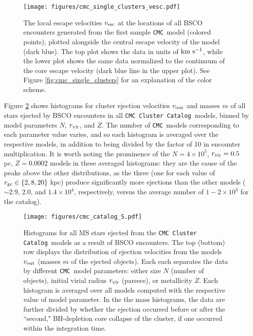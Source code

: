 \documentclass[twocolumn]{aastex631}
\newcommand{\CMC}{\texttt{CMC}}
\newcommand{\CMCcat}{\texttt{CMC Cluster Catalog}}
\begin{document}
\begin{figure}
    \centering
    \texttt{[image: figures/cmc\_single\_clusters\_vesc.pdf]}
    \caption{
        The local escape velocities $v_{\rm esc}$ at the locations of all BSCO encounters generated from the first sample \CMC\ model (colored points), plotted alongside the central escape velocity of the model (dark blue).
        The top plot shows the data in units of ${\rm km~s^{-1}}$, while the lower plot shows the same data normalized to the continuum of the core escape velocity (dark blue line in the upper plot).
        See Figure \ref{fig:cmc_single_clusters} for an explanation of the color scheme.
    }
    \label{fig:cmc_single_clusters_vesc}
\end{figure}

Figure \ref{fig:cmc_catalog} shows histograms for cluster ejection velocities $v_{\rm out}$ and masses $m$ of all stars ejected by BSCO encounters in all \CMCcat\ models, binned by model parameters $N$, $r_{\rm vir}$, and $Z$.
The number of \CMC\ models corresponding to each parameter value varies, and so each histogram is averaged over the respective models, in addition to being divided by the factor of 10 in encounter multiplication.
It is worth noting the prominence of the $N = 4\times10^5$, $r_{\rm vir} = 0.5$ pc, $Z = 0.0002$ models in these averaged histograms: they are the cause of the peaks above the other distributions, as the three (one for each value of $r_{\rm gc} \in \{2, 8, 20\}$ kpc) produce significantly more ejections than the other models ($\sim$2.9, 2.0, and $1.4 \times 10^4$, respectively, versus the average number of $1-2 \times 10^3$ for the catalog).

\begin{figure*}
    \centering
    \texttt{[image: figures/cmc\_catalog\_S.pdf]}
    \caption{
        Histograms for all MS stars ejected from the \CMCcat\ models as a result of BSCO encounters.
        The top (bottom) row displays the distribution of ejection velocities from the models $v_{\rm out}$ (masses $m$ of the ejected objects).
        Each each separates the data by different \CMC\ model parameters: either size $N$ (number of objects), initial virial radius $r_{\rm vir}$ (parsecs), or metallicity $Z$.
        Each histogram is averaged over all models computed with the respective value of model parameter.
        In the the mass histograms, the data are further divided by whether the ejection occurred before or after the ``second," BH-depletion core collapse of the cluster, if one occurred within the integration time.
    }
    \label{fig:cmc_catalog}
\end{figure*}
\end{document}
